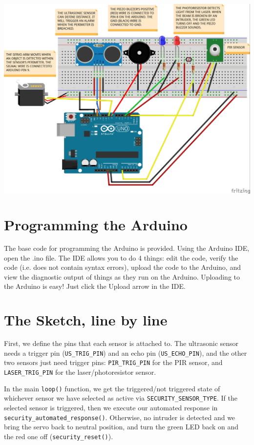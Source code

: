 \documentclass{article}
\begin{document}
\begin{center}
  \label{fig:schematic}
\includegraphics[width=\textwidth]{intruder-alarm.jpg}
\end{center}


\section{Programming the Arduino}
The base code for programming the Arduino is provided. Using the Arduino IDE, open
the .ino file.  The IDE allows you to do 4 things: edit the code, verify the code
(i.e. does not contain syntax errors), upload the code to the Arduino, and view the
diagnostic output of things as they run on the Arduino.  Uploading to the Arduino is
easy! Just click the Upload arrow in the IDE.

\section{The Sketch, line by line}
First, we define the pins that each sensor is attached to. The ultrasonic sensor
needs a trigger pin (\verb|US_TRIG_PIN|) and an echo pin (\verb|US_ECHO_PIN|), and
the other two sensors just need trigger pins: \verb|PIR_TRIG_PIN| for the PIR sensor,
and \verb|LASER_TRIG_PIN| for the laser/photoresistor sensor.

In the main \verb|loop()| function, we get the triggered/not triggered state of
whichever sensor we have selected as active via \verb|SECURITY_SENSOR_TYPE|. If the
selected sensor is triggered, then we execute our automated response in
\verb|security_automated_response()|. Otherwise, no intruder is detected and we bring
the servo back to neutral position, and turn the green LED back on and the red one
off (\verb|security_reset()|).
\end{document}

